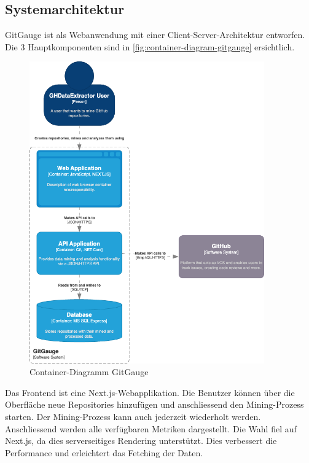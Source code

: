 \subsection{Systemarchitektur}
GitGauge ist als Webanwendung mit einer Client-Server-Architektur entworfen. Die 3 Hauptkomponenten sind in \autoref{fig:container-diagram-gitgauge} ersichtlich. 
\begin{figure}[htbp]
    \centering
        \includegraphics[width=0.9\textwidth]{Figures/container-diagram-gitgauge.png}
    \caption{Container-Diagramm GitGauge \parencite{grand_joel_vt1_joelgrand_repository_2024}}
    \label{fig:container-diagram-gitgauge}
\end{figure}

Das Frontend ist eine Next.js-Webapplikation. Die Benutzer können über die Oberfläche neue Repositories hinzufügen und anschliessend den Mining-Prozess starten. Der Mining-Prozess kann auch jederzeit wiederholt werden. Anschliessend werden alle verfügbaren Metriken dargestellt. Die Wahl fiel auf Next.js, da dies serverseitiges Rendering unterstützt. Dies verbessert die Performance und erleichtert das Fetching der Daten. \parencite{grand_joel_vt1_joelgrand_repository_2024}

